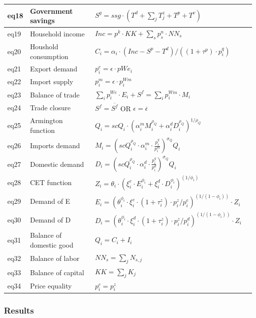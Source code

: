 \begin{table}[!h]
\begin{tabular}{llll}
		eq18 & Government savings & $S^g = ssg \cdot  (T^d + \sum_j T^z_j + T^p + T^v)$ \\
		\midrule
		eq19 & Household income &  $Inc = p^k \cdot KK + \sum_s p^n_s \cdot NN_s $ \\
		eq20 & Houshold consumption & $C_i = \alpha_i \cdot  (Inc -S^p - T^d) / ((1+\tau^p) \cdot p^q_i) $ \\
		\midrule
		eq21 & Export demand & $p^e_i = \epsilon \cdot pWe_i$ \\
		eq22 & Import supply & $p^m_i =\epsilon \cdot p^{Wm}_i$ \\
		eq23 & Balance of trade & $\sum_i p^{We}_i \cdot E_i +S^f = \sum_i p^{Wm}_i \cdot M_i$ \\
		eq24 & Trade closure & $S^f = \overline{S^f}$  \quad OR \quad $\epsilon = \overline{\epsilon}$  \\
		\midrule
		eq25 & Armington function & $Q_i = scQ_i \cdot (\alpha^m_i M_i^{\rho_Q} + \alpha^d_i D_i^{\rho_Q}  )^{1/\rho_Q} $ \\
		eq26 & Imports demand & $M_i = \left( scQ_i^{\rho_Q} \cdot \alpha_i^m \cdot \frac{p_i^q}{p_i^m} \right)^{\sigma_Q} Q_i$ \\
		eq27& Domestic demand & $D_i = \left( scQ_i^{\rho_Q} \cdot \alpha_i^d \cdot \frac{p_i^q}{p_i^d} \right)^{\sigma_Q} Q_i$ \\
		eq28 & CET function & $Z_i  = \theta_i \cdot  (\xi^e_i \cdot E_i^{\phi_i} + \xi^d_i \cdot D_i^{\phi_i} )^{(1/\phi_i)} $  \\
		eq29 & Demand of E & $  E_i = (\theta_i^{\phi_i} \cdot \xi^e_i\cdot (1+\tau^z_i) \cdot p^z_i/p^e_i)^{(1/(1-\phi_i))} \cdot Z_i $ \\
		eq30 & Demand of D & $ D_i = (\theta_i^{\phi_i} \cdot \xi^d_i \cdot (1+\tau^z_i) \cdot p^z_i/p^d_i)^{(1/(1-\phi_i))} \cdot Z_i $ \\
		\midrule
		eq31 &  Balance of domestic good & $Q_i = C_i + I_i$ &  \\
		eq32 & Balance of labor & $NN_s = \sum_j N_{s,j}$ &   \\
		eq33 & Balance of capital & $KK  = \sum_j K_j $ &   \\
		eq34 & Price equality & $p^c_i = p^z_i$ & \\ 
		\bottomrule
	\end{tabular}
\end{table}

\clearpage

\subsubsection{Results}

